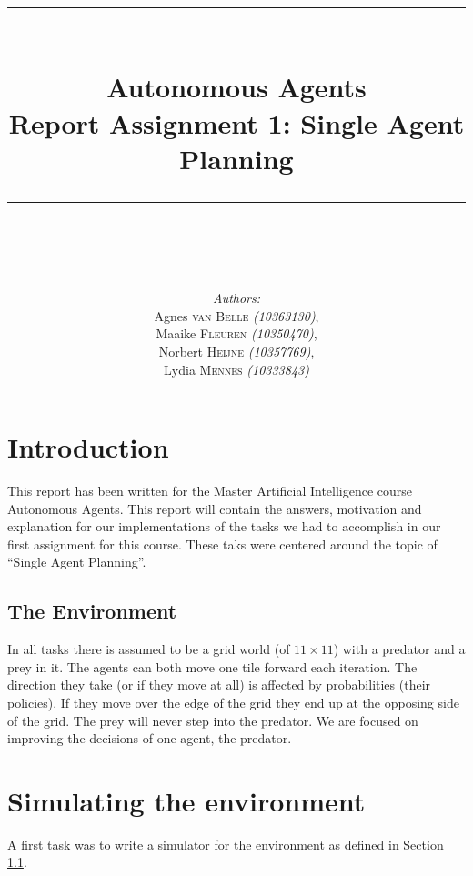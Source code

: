 \documentclass{article}
\newcommand{\HRule}{\rule{\linewidth}{0.1mm}}
\begin{document}
\title{ \HRule \\[0.2cm]
		Autonomous Agents\\ 
		Report Assignment 1: Single Agent Planning\\
		\HRule \\[0.1cm]
		}
		
\author{
		\emph{Authors:}\\[0.2cm]
		Agnes \textsc{van Belle} \small{ \emph{(10363130)}},\\ 
		Maaike \textsc{Fleuren} \small{ \emph{(10350470)}}, \\
		Norbert \textsc{Heijne} \small{ \emph{(10357769)}}, \\
		Lydia \textsc{Mennes} \small{ \emph{(10333843)}}
		}

 
\maketitle

\section{Introduction}
This report has been written for the Master Artificial Intelligence course Autonomous Agents. This report will contain the answers, motivation and explanation for our implementations of the tasks we had to accomplish in our first assignment for this course. These taks were centered around the topic of ``Single Agent Planning''. 

\subsection{The Environment}\label{environment}
In all tasks there is assumed to be a grid world (of $11 \times 11$) with a predator and a prey in it. The agents can both move one tile forward each iteration. The direction they take (or if they move at all) is affected by probabilities (their policies). If they move over the edge of the grid they end up at the opposing side of the grid. The prey will never step into the predator. We are focused on improving the decisions of one agent, the predator. 



\section{Simulating the environment}
A first task was to write a simulator for the environment as defined in Section \ref{environment}.
\end{document}
